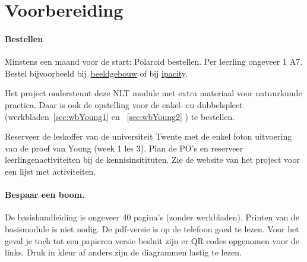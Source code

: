 \documentclass[../../main.tex]{subfiles}
\begin{document}

\section*{Voorbereiding}
\paragraph*{Bestellen}Minstens een maand voor de start: Polaroid bestellen.  Per leerling ongeveer 1 A7. Bestel bijvoorbeeld bij~\href{ 
https://webshop.hetbeeldgebouw.nl/polarisatie-filter-folie-formaat-a4}{beeldgebouw} of bij \href{https://ipacity.biedmeer.nl/}{ipacity}. 

Het project  ondersteunt deze NLT module met extra materiaal voor natuurkunde practica. Daar is ook de opstelling voor de enkel- en dubbelspleet (werkbladen~\ref{sec:wbYoung1} en ~\ref{sec:wbYoung2} ) te bestellen.

Reserveer de leskoffer van de universiteit Twente met de enkel foton uitvoering van de proef van Young (week 1 les 3). Plan de PO's en reserveer leerlingenactiviteiten bij de kennisinsitituten. Zie de website van het project voor een lijst met activiteiten.

\paragraph*{Bespaar een boom.}
De basishandleiding is ongeveer \num{40} pagina's (zonder werkbladen). Printen van de basismodule is niet nodig. De pdf-versie is op de telefoon goed te lezen. Voor het geval je toch tot een papieren versie besluit zijn er QR codes opgenomen voor de links. Druk in kleur af anders zijn de diagrammen lastig te lezen.
\end{document}
